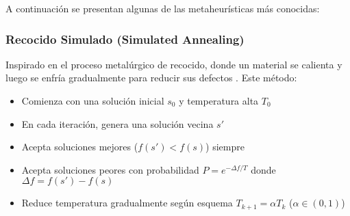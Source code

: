 


A continuación se presentan algunas de las metaheurísticas más conocidas:

\subsubsection{Recocido Simulado (Simulated Annealing)}
\label{subsec:recocido-simulado}

Inspirado en el proceso metalúrgico de recocido, donde un material se calienta y luego se enfría gradualmente para reducir sus defectos \cite{Kirkpatrick1983}. Este método:

\begin{itemize}
    \item Comienza con una solución inicial $s_0$ y temperatura alta $T_0$
    \item En cada iteración, genera una solución vecina $s'$
    \item Acepta soluciones mejores ($f(s') < f(s)$) siempre
    \item Acepta soluciones peores con probabilidad $P = e^{-\Delta f / T}$ donde $\Delta f = f(s') - f(s)$
    \item Reduce temperatura gradualmente según esquema $T_{k+1} = \alpha T_k$ ($\alpha \in (0,1)$)
\end{itemize}

